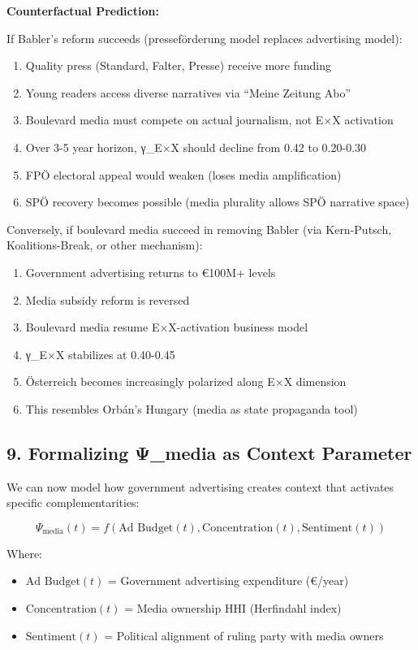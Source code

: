 \textbf{Counterfactual Prediction:}

If Babler's reform succeeds (presseförderung model replaces advertising model):

\begin{enumerate}
\item Quality press (Standard, Falter, Presse) receive more funding
\item Young readers access diverse narratives via ``Meine Zeitung Abo''
\item Boulevard media must compete on actual journalism, not E×X activation
\item Over 3-5 year horizon, γ_{E×X} should decline from 0.42 to 0.20-0.30
\item FPÖ electoral appeal would weaken (loses media amplification)
\item SPÖ recovery becomes possible (media plurality allows SPÖ narrative space)
\end{enumerate}

Conversely, if boulevard media succeed in removing Babler (via Kern-Putsch,
Koalitions-Break, or other mechanism):

\begin{enumerate}
\item Government advertising returns to €100M+ levels
\item Media subsidy reform is reversed
\item Boulevard media resume E×X-activation business model
\item γ_{E×X} stabilizes at 0.40-0.45
\item Österreich becomes increasingly polarized along E×X dimension
\item This resembles Orbán's Hungary (media as state propaganda tool)
\end{enumerate}

\subsection*{9. Formalizing Ψ_media as Context Parameter}

We can now model how government advertising creates context that activates
specific complementarities:

\[
\Psi_{\text{media}}(t) = f\left(
  \text{Ad Budget}(t),
  \text{Concentration}(t),
  \text{Sentiment}(t)
\right)
\]

Where:
\begin{itemize}
\item $\text{Ad Budget}(t)$ = Government advertising expenditure (€/year)
\item $\text{Concentration}(t)$ = Media ownership HHI (Herfindahl index)
\item $\text{Sentiment}(t)$ = Political alignment of ruling party with media owners
\end{itemize}

